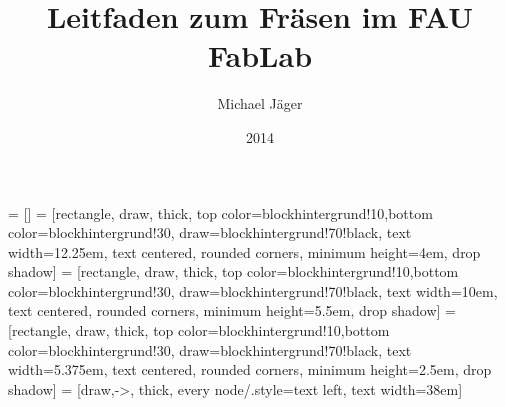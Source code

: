 \documentclass{../../vorlagen/fablab-aushang}
\date{2014}
\author{Michael Jäger}
\title{Leitfaden zum Fräsen im FAU FabLab}
\begin{document}
 = []
 = [rectangle, draw, thick, top color=blockhintergrund!10,bottom color=blockhintergrund!30, draw=blockhintergrund!70!black,
    text width=12.25em, text centered, rounded corners, minimum height=4em, drop shadow]
 = [rectangle, draw, thick, top color=blockhintergrund!10,bottom color=blockhintergrund!30, draw=blockhintergrund!70!black,
    text width=10em, text centered, rounded corners, minimum height=5.5em, drop shadow]
 = [rectangle, draw, thick, top color=blockhintergrund!10,bottom color=blockhintergrund!30, draw=blockhintergrund!70!black,
    text width=5.375em, text centered, rounded corners, minimum height=2.5em, drop shadow]
 = [draw,->, thick, every node/.style={text left, text width=38em}]

\vspace{1em}
\end{document}
